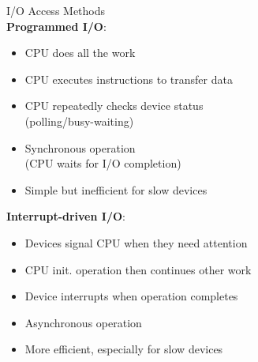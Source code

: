 \begin{definition}{I/O Access Methods}\\
    \textbf{Programmed I/O}:
            \begin{itemize}
                \item CPU does all the work
                \item CPU executes instructions to transfer data
                \item CPU repeatedly checks device status \\ (polling/busy-waiting)
                \item Synchronous operation \\ (CPU waits for I/O completion)
                \item Simple but inefficient for slow devices
            \end{itemize}
    \textbf{Interrupt-driven I/O}:
            \begin{itemize}
                \item Devices signal CPU when they need attention
                \item CPU init. operation then continues other work
                \item Device interrupts when operation completes
                \item Asynchronous operation
                \item More efficient, especially for slow devices
            \end{itemize}
\end{definition}

